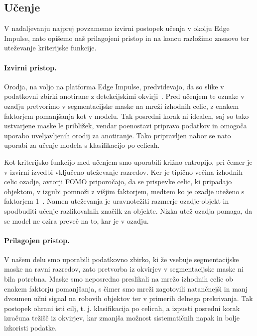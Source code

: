 \documentclass[a4paper,twoside,openright,12pt,slovene]{book}
\begin{document}
        \subsection{Učenje} \label{sct:fomo-ucenje}

            V nadaljevanju najprej povzamemo izvirni postopek učenja v okolju Edge Impulse, nato opišemo naš prilagojeni pristop in na koncu razložimo zasnovo ter uteževanje kriterijske funkcije.

            \paragraph{Izvirni pristop.}
            Orodja, na voljo na platforma Edge Impulse, predvidevajo, da so slike v podatkovni zbirki anotirane z detekcijskimi okvirji~\cite{src:fomodocs}. Pred učenjem te oznake v ozadju pretvorimo v segmentacijske maske na mreži izhodnih celic, z enakem faktorjem pomanjšanja kot v modelu. Tak posredni korak ni idealen, saj so tako ustvarjene maske le približek, vendar poenostavi pripravo podatkov in omogoča uporabo uveljavljenih orodij za anotiranje. Tako pripravljen nabor se nato uporabi za učenje modela s klasifikacijo po celicah.

            Kot kriterijsko funkcijo med učenjem smo uporabili križno entropijo, pri čemer je v izvirni izvedbi vključeno uteževanje razredov. Ker je tipično večina izhodnih celic ozadje, avtorji FOMO priporočajo, da se prispevke celic, ki pripadajo objektom, v izgubi pomnoži z višjim faktorjem, medtem ko je ozadje uteženo s faktorjem 1~\cite{src:fomodocs}. Namen uteževanja je uravnotežiti razmerje ozadje-objekt in spodbuditi učenje razlikovalnih značilk za objekte. Nizka utež ozadja pomaga, da se model ne ozira preveč na to, kar je v ozadju.

            \paragraph{Prilagojen pristop.}
            V našem delu smo uporabili podatkovno zbirko, ki že vsebuje segmentacijske maske na ravni razredov, zato pretvorba iz okvirjev v segmentacijske maske ni bila potrebna. Maske smo neposredno preslikali na mrežo izhodnih celic ob enakem faktorju pomanjšanja, s čimer smo mreži zagotovili natančnejši in manj dvoumen učni signal na robovih objektov ter v primerih delnega prekrivanja. Tak postopek ohrani isti cilj, t. j. klasifikacija po celicah, a izpusti posredni korak izračuna težišč iz okvirjev, kar zmanjša možnost sistematičnih napak in bolje izkoristi podatke.
            
\end{document}
